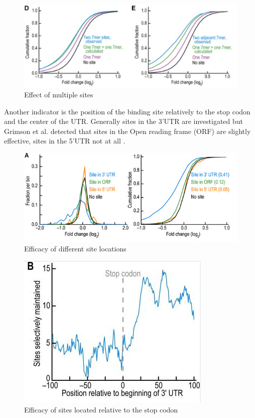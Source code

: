 \documentclass[12pt]{article}
\begin{document}
\begin{figure}[h]
\centering
\includegraphics[scale=0.7]{results/sites_distance.PNG}
\caption{Effect of multiple sites}
\label{sitedistance}
\end{figure}

Another indicator is the position of the binding site relatively to the stop codon and the center of the UTR. Generally sites in the 3'UTR are investigated but Grimson et al. detected that sites in the Open reading frame (ORF) are slightly effective, sites in the 5'UTR not at all \cite{Grimson}. \\

\begin{figure}[h]
\centering
\includegraphics[scale=0.6]{results/sites_orf.PNG}
\caption{Efficacy of different site locations}
\label{siteorf}
\end{figure}

\begin{figure}[h]
\centering
\includegraphics[scale=0.5]{results/site_stop.PNG} 
\caption{Efficacy of sites located relative to the stop codon}
\label{sitestop}
\end{figure}
\end{document}

